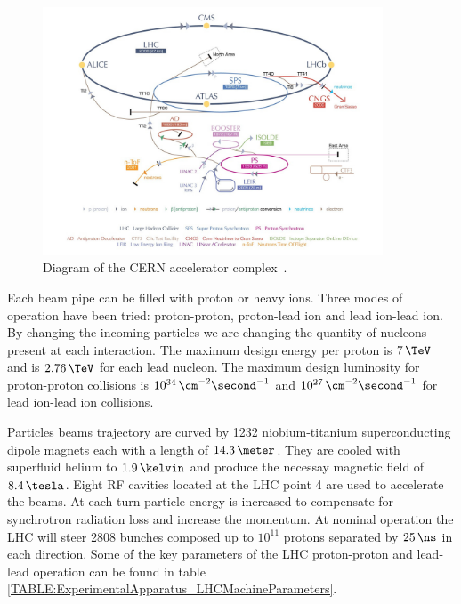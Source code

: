 \begin{figure}[!htb]
  \centering
  \includegraphics[width=0.90\textwidth]{Chapter02/LHC/Images/CERNAcceleratorComplex.jpg}
  \caption{Diagram of the \gls{CERN} accelerator complex~\cite{IMAGEREF:CERNAcceleratorComplex}.}
  \label{FIGURE:ExperimentalApparatus_LHCAccelaratorChain}
\end{figure}

Each beam pipe can be filled with proton or heavy ions. Three modes of operation have been tried: proton-proton, proton-lead ion and lead ion-lead ion. By changing the incoming particles we are changing the quantity of nucleons present at each interaction. The maximum design energy per proton is $7\,\TeV$ and is $2.76\,\TeV$ for each lead nucleon. The maximum design luminosity for proton-proton collisions is $10^{34}\,\cm^{-2}\second^{-1}$ and $10^{27}\,\cm^{-2}\second^{-1}$ for lead ion-lead ion collisions.

Particles beams trajectory are curved by 1232 niobium-titanium superconducting dipole magnets each with a length of $14.3\,\meter$. They are cooled with superfluid helium to $1.9\,\kelvin$ and produce the necessay magnetic field of $8.4\,\tesla$. Eight \gls{RF} cavities located at the \gls{LHC} point 4 are used to accelerate the beams. At each turn particle energy is increased to compensate for synchrotron radiation loss and increase the momentum. At nominal operation the \gls{LHC} will steer 2808 bunches composed up to $10^{11}$ protons separated by $25\,\ns$ in each direction. Some of the key parameters of the \gls{LHC} proton-proton and lead-lead operation can be found in table \ref{TABLE:ExperimentalApparatus_LHCMachineParameters}.

